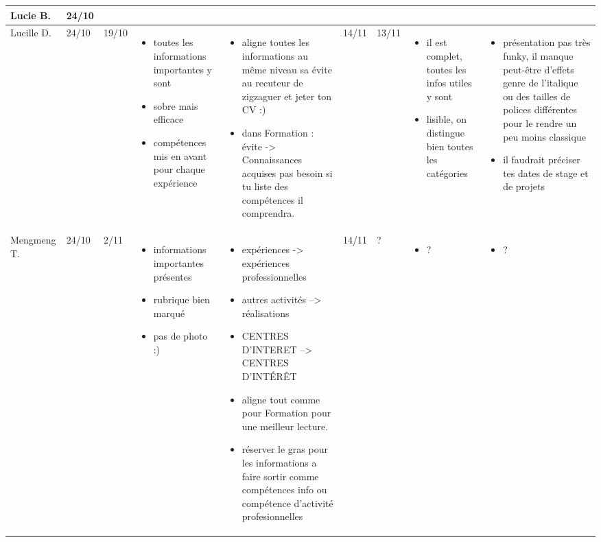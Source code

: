\documentclass[a4paper,11pt]{article}
\begin{document}
\begin{landscape}
\begin{longtable}{|l|l|l|p{4cm}|p{4cm}|l|l|p{4cm}|p{4cm}|}
    Lucie B. & 24/10 & & & & & & & \\ \hline

    Lucille D.  & 24/10 & 19/10
		& \begin{itemize}
		  \item toutes les informations importantes y sont
		  \item sobre mais efficace
		  \item compétences mis en avant pour chaque expérience
		  \end{itemize}
		& \begin{itemize}
		  \item aligne toutes les informations au même niveau sa évite au recuteur de zigzaguer et jeter ton CV :)
		  \item dans Formation : évite -> Connaissances acquises  pas besoin si tu liste des compétences il comprendra.
		  \end{itemize}
		& 14/11 & 13/11
		& \begin{itemize}
		  \item il est complet, toutes les infos utiles y sont
		  \item lisible, on distingue bien toutes les catégories
		  \end{itemize}
		& \begin{itemize}
		  \item présentation pas très funky, il manque peut-être d'effets genre de l'italique ou des tailles de polices différentes pour le rendre un peu moins classique
		  \item il faudrait préciser tes dates de stage et de projets
		  \end{itemize} \\ \hline

    Mengmeng T. & 24/10 & 2/11
		& \begin{itemize}
		  \item informations importantes présentes
		  \item rubrique bien marqué
		  \item pas de photo :)
		  \end{itemize}
		& \begin{itemize}
		  \item expériences -> expériences professionnelles
		  \item autres activités --> réalisations
		  \item CENTRES D'INTERET --> CENTRES D’INTÉRÊT
		  \item aligne tout comme pour Formation pour une meilleur lecture.
		  \item réserver le gras pour les informations a faire sortir comme compétences info ou compétence d'activité profesionnelles
		  \end{itemize} 
		& 14/11 & ?
		& \begin{itemize}
		  \item ?
		  \end{itemize}
		& \begin{itemize}
		  \item ?
		  \end{itemize} \\ \hline


\end{longtable}
\end{landscape}
\end{document}

